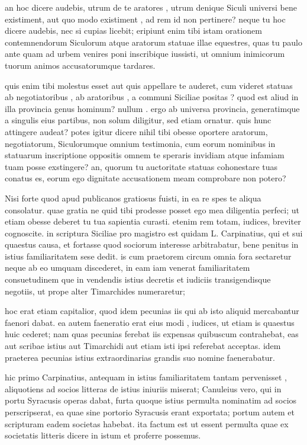  an hoc dicere audebis, utrum de te aratores , utrum denique Siculi universi bene existiment, aut quo modo existiment , ad rem id non pertinere? neque tu hoc dicere audebis, nec si cupias licebit; eripiunt enim tibi istam orationem contemnendorum Siculorum atque aratorum statuae illae equestres, quas tu paulo ante quam ad urbem venires poni inscribique iussisti, ut omnium inimicorum tuorum animos accusatorumque tardares.

 quis enim tibi molestus esset aut quis appellare te auderet, cum videret statuas ab negotiatoribus , ab aratoribus , a communi Siciliae positas ? quod est aliud in illa provincia genus hominum? nullum . ergo ab universa provincia, generatimque a singulis eius partibus, non solum diligitur, sed etiam ornatur. quis hunc attingere audeat? potes igitur dicere nihil tibi obesse oportere aratorum, negotiatorum, Siculorumque omnium testimonia, cum eorum nominibus in statuarum inscriptione oppositis omnem te speraris invidiam atque infamiam tuam posse exstingere? an, quorum tu auctoritate statuas cohonestare tuas conatus es, eorum ego dignitate accusationem meam comprobare non potero?

 Nisi forte quod apud publicanos gratiosus fuisti, in ea re spes te aliqua consolatur. quae gratia ne quid tibi prodesse posset ego mea diligentia perfeci; ut etiam obesse deberet tu tua sapientia curasti. etenim rem totam, iudices, breviter cognoscite. in scriptura Siciliae pro magistro est quidam L. Carpinatius, qui et sui quaestus causa, et fortasse quod sociorum interesse arbitrabatur, bene penitus in istius familiaritatem sese dedit. is cum praetorem circum omnia fora sectaretur neque ab eo umquam discederet, in eam iam venerat familiaritatem consuetudinem que in vendendis istius decretis et iudiciis transigendisque negotiis, ut prope alter Timarchides numeraretur;

 hoc erat etiam capitalior, quod idem pecunias iis qui ab isto aliquid mercabantur faenori dabat. ea autem faeneratio erat eius modi , iudices, ut etiam is quaestus huic cederet; nam quas pecunias ferebat iis expensas quibuscum contrahebat, eas aut scribae istius aut Timarchidi aut etiam isti ipsi referebat acceptas. idem praeterea pecunias istius extraordinarias grandis suo nomine faenerabatur.

 hic primo Carpinatius, antequam in istius familiaritatem tantam pervenisset , aliquotiens ad socios litteras de istius iniuriis miserat; Canuleius vero, qui in portu Syracusis operas dabat, furta quoque istius permulta nominatim ad socios perscripserat, ea quae sine portorio Syracusis erant exportata; portum autem et scripturam eadem societas habebat. ita factum est ut essent permulta quae ex societatis litteris dicere in istum et proferre possemus.

